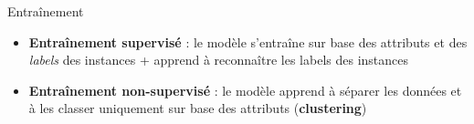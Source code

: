 \documentclass[compress]{beamer}
\begin{document}
\begin{frame}{Entraînement} \footnotesize
  \begin{figure}
  \centering
  \end{figure}
  \begin{itemize}
    \item<1-> \textbf{\color{fibeamer@orange}Entraînement supervisé} : le modèle s'entraîne sur base des attributs et des \textit{\color{fibeamer@orange}labels} des instances {\color{fibeamer@blue}+} apprend à reconnaître les labels des instances
    \item<2-> \textbf{\color{fibeamer@orange}Entraînement non-supervisé} : le modèle apprend à séparer les données et à les classer uniquement sur base des attributs (\textbf{\color{fibeamer@orange}clustering})
  \end{itemize}
\end{frame}
\end{document}

